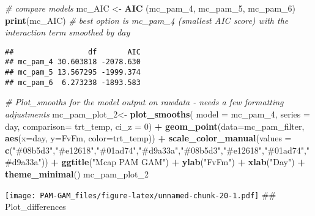 \documentclass[
]{article}
\newenvironment{Shaded}{\begin{snugshade}}{\end{snugshade}}
\newcommand{\AttributeTok}[1]{\textcolor[rgb]{0.13,0.29,0.53}{#1}}
\newcommand{\CommentTok}[1]{\textcolor[rgb]{0.56,0.35,0.01}{\textit{#1}}}
\newcommand{\DecValTok}[1]{\textcolor[rgb]{0.00,0.00,0.81}{#1}}
\newcommand{\FunctionTok}[1]{\textcolor[rgb]{0.13,0.29,0.53}{\textbf{#1}}}
\newcommand{\NormalTok}[1]{#1}
\newcommand{\OtherTok}[1]{\textcolor[rgb]{0.56,0.35,0.01}{#1}}
\newcommand{\SpecialCharTok}[1]{\textcolor[rgb]{0.81,0.36,0.00}{\textbf{#1}}}
\newcommand{\StringTok}[1]{\textcolor[rgb]{0.31,0.60,0.02}{#1}}
\begin{document}
\begin{Shaded}
\begin{Highlighting}[]
\CommentTok{\# compare models}
\NormalTok{mc\_AIC }\OtherTok{\textless{}{-}} \FunctionTok{AIC}\NormalTok{ (mc\_pam\_4, mc\_pam\_5, mc\_pam\_6)}
\FunctionTok{print}\NormalTok{(mc\_AIC) }\CommentTok{\# best option is mc\_pam\_4 (smallest AIC score) with the interaction term smoothed by day}
\end{Highlighting}
\end{Shaded}

\begin{verbatim}
##                 df       AIC
## mc_pam_4 30.603818 -2078.630
## mc_pam_5 13.567295 -1999.374
## mc_pam_6  6.273238 -1893.583
\end{verbatim}

\begin{Shaded}
\begin{Highlighting}[]
\CommentTok{\# Plot\_smooths for the model output on rawdata {-} needs a few formatting adjustments}
\NormalTok{mc\_pam\_plot\_2}\OtherTok{\textless{}{-}}
  \FunctionTok{plot\_smooths}\NormalTok{(}
  \AttributeTok{model =}\NormalTok{ mc\_pam\_4,}
\AttributeTok{series =}\NormalTok{ day,}
\AttributeTok{comparison=}\NormalTok{ trt\_temp,}
\AttributeTok{ci\_z =} \DecValTok{0}\NormalTok{) }\SpecialCharTok{+} 
  \FunctionTok{geom\_point}\NormalTok{(}\AttributeTok{data=}\NormalTok{mc\_pam\_filter, }
             \FunctionTok{aes}\NormalTok{(}\AttributeTok{x=}\NormalTok{day, }\AttributeTok{y=}\NormalTok{FvFm, }\AttributeTok{color=}\NormalTok{trt\_temp)) }\SpecialCharTok{+}
  \FunctionTok{scale\_color\_manual}\NormalTok{(}\AttributeTok{values =} \FunctionTok{c}\NormalTok{(}\StringTok{"\#08b5d3"}\NormalTok{,}\StringTok{"\#e12618"}\NormalTok{,}\StringTok{"\#01ad74"}\NormalTok{,}\StringTok{"\#d9a33a"}\NormalTok{,}\StringTok{"\#08b5d3"}\NormalTok{,}\StringTok{"\#e12618"}\NormalTok{,}\StringTok{"\#01ad74"}\NormalTok{,}\StringTok{"\#d9a33a"}\NormalTok{)) }\SpecialCharTok{+} 
  \FunctionTok{ggtitle}\NormalTok{(}\StringTok{"Mcap PAM GAM"}\NormalTok{) }\SpecialCharTok{+}
  \FunctionTok{ylab}\NormalTok{(}\StringTok{"FvFm"}\NormalTok{) }\SpecialCharTok{+}
  \FunctionTok{xlab}\NormalTok{(}\StringTok{"Day"}\NormalTok{) }\SpecialCharTok{+}
  \FunctionTok{theme\_minimal}\NormalTok{()}
\NormalTok{mc\_pam\_plot\_2}
\end{Highlighting}
\end{Shaded}

\texttt{[image: PAM-GAM\_files/figure-latex/unnamed-chunk-20-1.pdf]} \#\#
Plot\_differences
\end{document}
